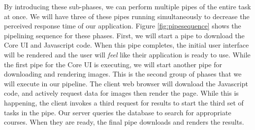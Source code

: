 By introducing these sub-phases, we can perform multiple pipes of the entire
task at once. We will have three of these pipes running simultaneously to
decrease the perceived response time of our application. Figure
\ref{fig:pipesequence} shows the pipelining sequence for these phases. First, we
will start a pipe to download the Core UI and Javascript code. When this pipe
completes, the initial user interface will be rendered and the user will
\textit{feel} like their application is ready to use. While the first pipe for
the Core UI is executing, we will start another pipe for downloading and
rendering images. This is the second group of phases that we will execute in our
pipeline. The client web browser will download the Javascript code, and actively
request data for images then render the page. While this is happening, the
client invokes a third request for results to start the third set of tasks in
the pipe. Our server queries the database to search for appropriate courses. 
When they are ready, the final pipe downloads and renders the results.
